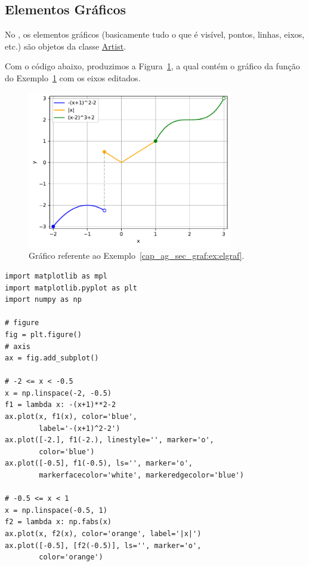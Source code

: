 \subsection{Elementos Gráficos}

No {\matplotlib}, os elementos gráficos (basicamente tudo o que é visível, pontos, linhas, eixos, etc.) são objetos da classe \href{https://matplotlib.org/stable/api/artist_api.html#artist-class}{Artist}.

\begin{ex}\label{cap_ag_sec_graf:ex:elgraf}
  Com o código abaixo, produzimos a Figura~\ref{cap_ag_sec_graf:fig:elgraf}, a qual contém o gráfico da função do Exemplo~\ref{cap_ag_sec_graf:fig:elgraf} com os eixos editados.

  \begin{figure}[H]
    \centering
    \includegraphics[width=0.8\textwidth]{./cap_ag/dados/fig_elgraf/fig}
    \caption{Gráfico referente ao Exemplo~\ref{cap_ag_sec_graf:ex:elgraf}.}
    \label{cap_ag_sec_graf:fig:elgraf}
  \end{figure}
  
\begin{lstlisting}
import matplotlib as mpl
import matplotlib.pyplot as plt
import numpy as np

# figure
fig = plt.figure()
# axis
ax = fig.add_subplot()

# -2 <= x < -0.5
x = np.linspace(-2, -0.5)
f1 = lambda x: -(x+1)**2-2
ax.plot(x, f1(x), color='blue',
        label='-(x+1)^2-2')
ax.plot([-2.], f1(-2.), linestyle='', marker='o',
        color='blue')
ax.plot([-0.5], f1(-0.5), ls='', marker='o',
        markerfacecolor='white', markeredgecolor='blue')

# -0.5 <= x < 1
x = np.linspace(-0.5, 1)
f2 = lambda x: np.fabs(x)
ax.plot(x, f2(x), color='orange', label='|x|')
ax.plot([-0.5], [f2(-0.5)], ls='', marker='o',
        color='orange')


\end{lstlisting}
\end{ex}
